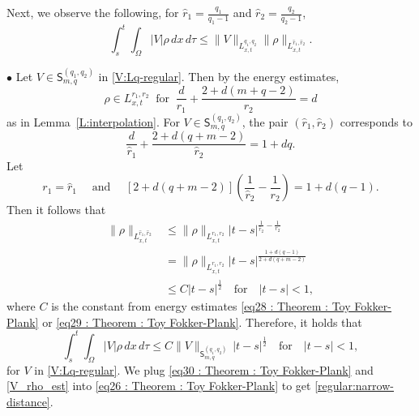 \documentclass{amsart}
\numberwithin{equation}{section}
\begin{document}
Next, we observe the following, for $\hat{r}_1 = \frac{q_1}{q_1 -1}$ and $\hat{r}_2 = \frac{q_2}{q_2 -1}$,
\[
 \int_{s}^{t} \int_{\Omega}  | V |\rho  \,dx\,d\tau \leq \| V\|_{L_{x,t}^{q_1,q_2}} \|\rho\|_{L_{x,t}^{\hat{r}_1, \hat{r}_2}}.
\]


$\bullet$ Let $V\in \mathsf{S}_{m,q}^{(q_1,q_2)}$ in \eqref{V:Lq-regular}. Then by the energy estimates, %
\[
\rho \in L_{x,t}^{r_1,r_2}  \ \text{ for }  \  \frac{d}{r_1} + \frac{2+d(m+q-2)}{r_2} = d
\]
as in Lemma~\ref{L:interpolation}. For $V\in \mathsf{S}_{m,q}^{(q_1,q_2)}$, the pair $(\hat{r}_1, \hat{r}_2)$ corresponds to 
\[
\frac{d}{\hat{r}_1} + \frac{2+d(q+m-2)}{\hat{r}_2} = 1+dq.
\]
Let  
\[
r_1 = \hat{r}_1 \quad \text{ and } \quad [2+d(q+m-2)] \left( \frac{1}{\hat{r}_2} - \frac{1}{r_2}\right)= 1+d(q-1). 
\]
Then it follows that 
\begin{equation}\label{eq31 : Theorem : Toy Fokker-Plank}
\begin{aligned}
 \|\rho \|_{L_{x,t}^{\hat{r}_1,\hat{r}_2}} 
& \leq \|\rho\|_{L_{x,t}^{r_1,r_2}} |t-s|^{\frac{1}{\hat{r}_2} -\frac{1}{r_2}}\\
&= \|\rho\|_{L_{x,t}^{r_1,r_2}} |t-s|^{\frac{1+d(q-1)}{2+d(q+m-2)}}\\
&\leq C |t-s|^{\frac{1}{2}} \quad \mbox{for} \quad |t-s| <1, 
\end{aligned} 
\end{equation}
where $C$ is the constant from energy estimates \eqref{eq28 : Theorem : Toy Fokker-Plank} or \eqref{eq29 : Theorem : Toy Fokker-Plank}. %
Therefore, it holds that 
\begin{equation}\label{V_rho_est}
\int_{s}^{t} \int_{\Omega}  | V |\rho  \,dx\,d\tau \leq C\|V\|_{\mathsf{S}_{m,q}^{(q_1,q_2)}} \,|t-s|^{\frac{1}{2}} \quad \mbox{for} \quad |t-s| <1,
\end{equation}
for $V$ in \eqref{V:Lq-regular}. We plug \eqref{eq30 : Theorem : Toy Fokker-Plank} and \eqref{V_rho_est} into \eqref{eq26 : Theorem : Toy Fokker-Plank} to get \eqref{regular:narrow-distance}. %
\end{document}
